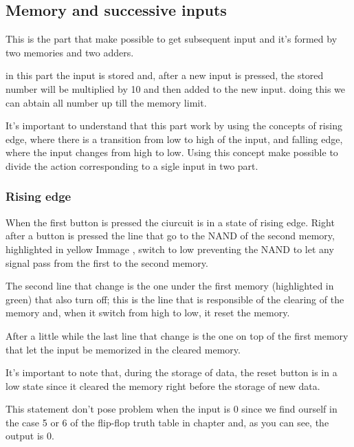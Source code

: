 \documentclass{article}
\begin{document}
\subsection{Memory and successive inputs}

This is the part that make possible to get subsequent input and it's formed by two memories and two adders. 

in this part the input is stored and, after a new input is pressed, the stored number will be multiplied by 10 and then added to the new input. doing this we can abtain all number up till the memory limit.

It's important to understand that this part work by using the concepts of rising edge, where there is a transition from low to high of the input, and falling edge, where the input changes from high to low. Using this concept make possible to divide the action corresponding to a sigle input in two part.



\subsubsection{Rising edge}

When the first button is pressed the ciurcuit is in a state of rising edge. 
Right after a button is pressed the line that go to the NAND of the second memory, highlighted in yellow Immage %
, switch to low preventing the NAND to let any signal pass from the first to the second memory.

The second line that change is the one under the first memory (highlighted in green) that also turn off; this is the line that is responsible of the clearing of the memory and, when it switch from high to low, it reset the memory.

After a little while the last line that change is the one on top of the first memory that let the input be memorized in the cleared memory.

\vspace{3mm}

It's important to note that, during the storage of data, the reset button is in a low state since it cleared the memory right before the storage of new data.

This statement don't pose problem when the input is 0 since we find ourself in the case 5 or 6 of the flip-flop truth table in chapter %
and, as you can see, the output is 0. 
\end{document}
